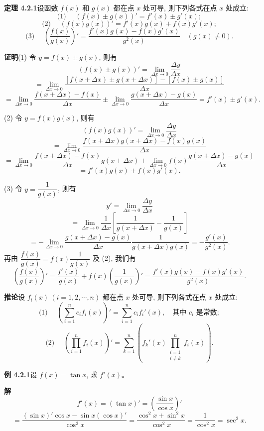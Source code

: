 \documentclass[UTF8, 12pt, fontset=fandol, oneside]{ctexart}
\begin{document}
\noindent\textbf{定理 4.2.1}\quad 设函数 $f(x)$ 和 $g(x)$ 都在点 $x$ 处可导, 则下列各式在点 $x$ 处成立:
\[
  \text{(1) }\quad
  (f(x)\pm g(x))'=f'(x)\pm g'(x);
\]
\[
  \text{(2) }\quad
  (f(x)g(x))'=f'(x)g(x)+f(x)g'(x);
\]
\[
  \text{(3) }\quad
  \left(\frac{f(x)}{g(x)}\right)'
  =
  \frac{f'(x)g(x)-f(x)g'(x)}{g^2(x)}
  \quad(g(x)\ne0).
\]

\noindent\textbf{证明}\quad (1) 令 $y=f(x)\pm g(x)$, 则有
\[
  (f(x)\pm g(x))'
  =
  \lim_{\Delta x\to0}\frac{\Delta y}{\Delta x}
\]
\[
  =
  \lim_{\Delta x\to0}
  \frac{[f(x+\Delta x)\pm g(x+\Delta x)]-[f(x)\pm g(x)]}
       {\Delta x}
\]
\[
  =
  \lim_{\Delta x\to0}\frac{f(x+\Delta x)-f(x)}{\Delta x}
  \pm
  \lim_{\Delta x\to0}\frac{g(x+\Delta x)-g(x)}{\Delta x}
  =
  f'(x)\pm g'(x).
\]

(2) 令 $y=f(x)g(x)$, 则有
\[
  (f(x)g(x))'
  =
  \lim_{\Delta x\to0}\frac{\Delta y}{\Delta x}
\]
\[
  =
  \lim_{\Delta x\to0}
  \frac{f(x+\Delta x)g(x+\Delta x)-f(x)g(x)}
       {\Delta x}
\]
\[
  =
  \lim_{\Delta x\to0}
  \frac{f(x+\Delta x)-f(x)}{\Delta x}g(x+\Delta x)
  +
  \lim_{\Delta x\to0}
  f(x)\frac{g(x+\Delta x)-g(x)}{\Delta x}
\]
\[
  =
  f'(x)g(x)+f(x)g'(x).
\]

(3) 令 $y=\dfrac1{g(x)}$, 则有
\[
  y'=
  \lim_{\Delta x\to0}\frac{\Delta y}{\Delta x}
\]
\[
  =
  \lim_{\Delta x\to0}
  \frac1{\Delta x}
  \left[
    \frac1{g(x+\Delta x)}-\frac1{g(x)}
  \right]
\]
\[
  =
  -
  \lim_{\Delta x\to0}
  \frac{g(x+\Delta x)-g(x)}{\Delta x}
  \frac1{g(x+\Delta x)g(x)}
  =
  -\frac{g'(x)}{g^2(x)}.
\]
再由 $\dfrac{f(x)}{g(x)}=f(x)\dfrac1{g(x)}$ 及 (2), 我们有
\[
  \left(\frac{f(x)}{g(x)}\right)'
  =
  \frac{f'(x)}{g(x)}
  +
  f(x)\left(\frac1{g(x)}\right)'
  =
  \frac{f'(x)g(x)-f(x)g'(x)}{g^2(x)}.
\]

\noindent\textbf{推论}\quad 设 $f_i(x)\ (i=1,2,\cdots,n)$ 都在点 $x$ 处可导, 则下列各式在点 $x$ 处成立:
\[
  \text{(1) }\quad
  \left(\sum_{i=1}^{n}c_if_i(x)\right)'
  =
  \sum_{i=1}^{n}c_if_i'(x),
  \quad\text{其中 }c_i\text{ 是常数};
\]
\[
  \text{(2) }\quad
  \left(\prod_{i=1}^{n}f_i(x)\right)'
  =
  \sum_{k=1}^{n}
  \left(
    f_k'(x)\prod_{\substack{i=1\\i\ne k}}^{n}f_i(x)
  \right).
\]

\noindent\textbf{例 4.2.1}\quad 设 $f(x)=\tan x$, 求 $f'(x)$。

\noindent\textbf{解}\quad
\[
  f'(x)=(\tan x)'=\left(\frac{\sin x}{\cos x}\right)'
\]
\[
  =
  \frac{(\sin x)'\cos x-\sin x(\cos x)'}{\cos^2 x}
  =
  \frac{\cos^2 x+\sin^2 x}{\cos^2 x}
  =
  \frac1{\cos^2 x}
  =
  \operatorname{sec}^2x.
\]
\end{document}
